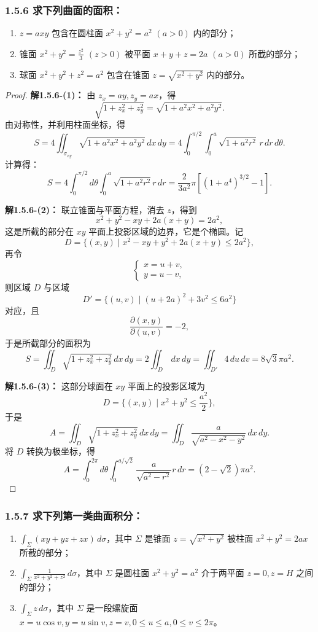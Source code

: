 \documentclass[12pt]{ctexart}
\begin{document}
\subsubsection*{1.5.6 求下列曲面的面积：}
\begin{enumerate}
    \item $z = axy$ 包含在圆柱面 $x^2 + y^2 = a^2$ $(a > 0)$ 内的部分；
    \item 锥面 $x^2 + y^2 = \frac{z^2}{3}$ $(z > 0)$ 被平面 $x + y + z = 2a$ $(a > 0)$ 所截的部分；
    \item 球面 $x^2 + y^2 + z^2 = a^2$ 包含在锥面 $z = \sqrt{x^2 + y^2}$ 内的部分。
\end{enumerate}

\begin{proof}
	\textbf{解1.5.6-(1)：} 由 $z_x = ay, z_y = ax$，得
\[
\sqrt{1 + z_x^2 + z_y^2} = \sqrt{1 + a^2 x^2 + a^2 y^2}.
\]
由对称性，并利用柱面坐标，得
\[
S = 4 \iint_{\sigma_{xy}} \sqrt{1 + a^2 x^2 + a^2 y^2} \, dx \, dy = 4 \int_0^{\pi/2} \int_0^a \sqrt{1 + a^2 r^2} \, r \, dr \, d\theta.
\]
计算得：
\[
S = 4 \int_0^{\pi/2} d\theta \int_0^a \sqrt{1 + a^2 r^2} r \, dr = \frac{2}{3a^2} \pi \left[ (1 + a^4)^{3/2} - 1 \right].
\]

\textbf{解1.5.6-(2)：} 联立锥面与平面方程，消去 $z$，得到
\[
x^2 + y^2 - xy + 2a(x + y) = 2a^2,
\]
这是所截的部分在 $xy$ 平面上投影区域的边界，它是个椭圆。记
\[
D = \{(x, y) \mid x^2 - xy + y^2 + 2a(x + y) \leq 2a^2\},
\]
再令
\[
\begin{cases}
x = u + v, \\
y = u - v,
\end{cases}
\]
则区域 $D$ 与区域
\[
D' = \{(u, v) \mid (u + 2a)^2 + 3v^2 \leq 6a^2\}
\]
对应，且
\[
\frac{\partial(x, y)}{\partial(u, v)} = -2,
\]
于是所截部分的面积为
\[
S = \iint_D \sqrt{1 + z_x^2 + z_y^2} \, dx \, dy = 2 \iint_D \, dx \, dy = \iint_{D'} 4 \, du \, dv = 8\sqrt{3} \pi a^2.
\]

\textbf{解1.5.6-(3)：} 这部分球面在 $xy$ 平面上的投影区域为
\[
D = \{(x, y) \mid x^2 + y^2 \leq \frac{a^2}{2}\},
\]
于是
\[
A = \iint_D \sqrt{1 + z_x^2 + z_y^2} \, dx \, dy = \iint_D \frac{a}{\sqrt{a^2 - x^2 - y^2}} \, dx \, dy.
\]
将 $D$ 转换为极坐标，得
\[
A = \int_0^{2\pi} d\theta \int_0^{a/\sqrt{2}} \frac{a}{\sqrt{a^2 - r^2}} r \, dr
= (2 - \sqrt{2}) \pi a^2.
\]

\end{proof}

\subsubsection*{1.5.7 求下列第一类曲面积分：}
\begin{enumerate}
    \item $\int_{\Sigma} (xy + yz + zx) \, d\sigma$，其中 $\Sigma$ 是锥面 $z = \sqrt{x^2 + y^2}$ 被柱面 $x^2 + y^2 = 2ax$ 所截的部分；
    \item $\int_{\Sigma} \frac{1}{x^2 + y^2 + z^2} \, d\sigma$，其中 $\Sigma$ 是圆柱面 $x^2 + y^2 = a^2$ 介于两平面 $z = 0, z = H$ 之间的部分；
    \item $\int_{\Sigma} z \, d\sigma$，其中 $\Sigma$ 是一段螺旋面 $x = u \cos v, y = u \sin v, z = v, 0 \leq u \leq a, 0 \leq v \leq 2\pi$。
\end{enumerate}
\end{document}
